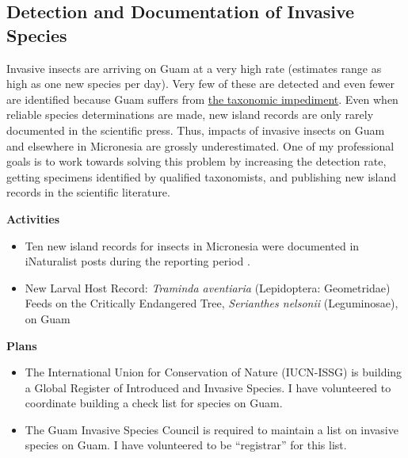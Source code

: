 \documentclass[12pt,english]{scrartcl}
\newcommand{\activities}{\medskip\textbf{Activities}}
\newcommand{\plans}{\medskip\textbf{Plans}}
\begin{document}
\subsection{Detection and Documentation of Invasive Species}
\begin{refsection}

Invasive insects are arriving on Guam at a very high rate (estimates
range as high as one new species per day). Very few of these are detected
and even fewer are identified because Guam suffers from \href{https://en.wikipedia.org/wiki/Taxonomic_impediment}{the taxonomic impediment}.
Even when reliable species determinations are made, new island records
are only rarely documented in the scientific press. Thus, impacts
of invasive insects on Guam and elsewhere in Micronesia are grossly
underestimated. One of my professional goals is to work towards solving
this problem by increasing the detection rate, getting specimens identified
by qualified taxonomists, and publishing new island records in the
scientific literature.

\activities

\begin{itemize}
	
\item Ten new island records for insects in Micronesia were documented in iNaturalist posts during the reporting period \cite{inat36470788,inat36285968,inat35845152,inat32572967,inat31326484,inat29333274,inat18166461,inat16734728,inat15747194,inat15067449,inat13466275}.

\item New Larval Host Record: \textit{Traminda aventiaria} (Lepidoptera: Geometridae) Feeds on the Critically Endangered Tree, \textit{Serianthes nelsonii} (Leguminosae), on Guam~\cite{moore_new_2020}

\end{itemize}

\plans

\begin{itemize}

\item The International Union for Conservation of Nature (IUCN-ISSG) is
building a Global Register of Introduced and Invasive Species. I have
volunteered to coordinate building a check list for species on Guam.

\item The Guam Invasive Species Council is required to maintain a list on
invasive species on Guam. I have volunteered to be ``registrar''
for this list.

\end{itemize}

\printbibliography
\end{refsection}
\end{document}
